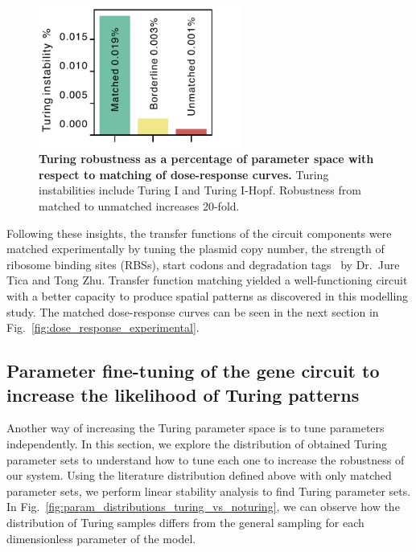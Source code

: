 \begin{figure}[H]
    \centering
    \includegraphics[width=0.6\textwidth]{chapters/Chapter 2/balancing_robustness}
    \caption{\textbf{Turing robustness as a percentage of parameter space with respect to matching of dose-response curves.} Turing instabilities include Turing I and Turing I-Hopf. Robustness from matched to unmatched increases 20-fold.}
    \label{fig:balancing_robustness}
\end{figure}

Following these insights, the transfer functions of the circuit components were matched experimentally by tuning the plasmid copy number,
the strength of ribosome binding sites (RBSs),
start codons and degradation tags~\parencite{Andersen1998, Wang2011,Hecht2017} by Dr.~Jure Tica and Tong Zhu.
Transfer function matching yielded a well-functioning circuit with a better capacity to produce spatial patterns
as discovered in this modelling study.
The matched dose-response curves can be seen in the next section in Fig.~\ref{fig:dose_response_experimental}.


\subsection{Parameter fine-tuning of the gene circuit to increase the likelihood of Turing patterns}
Another way of increasing the Turing parameter space is to tune parameters independently.
In this section, we explore the distribution of obtained Turing parameter sets
to understand how to tune each one to increase the robustness of our system.
Using the literature distribution defined above with only matched
parameter sets, we perform linear stability analysis to find Turing parameter sets.
In Fig.~\ref{fig:param_distributions_turing_vs_noturing},
we can observe how the distribution of Turing samples differs from the general sampling for each dimensionless parameter of the model.

